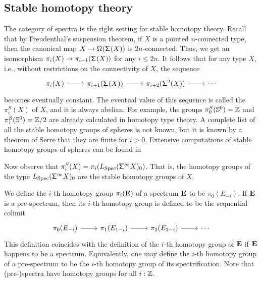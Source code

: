 \documentclass[reqno]{amsart}
\begin{document}
\subsection{Stable homotopy theory}
The category of spectra is the right setting for stable homotopy theory. Recall
that by Freudenthal's suspension theorem, if $X$ is a pointed $n$-connected
type, then the canonical map $X\to\mathsf{\Omega}^{}(\mathsf{\Sigma}^{}(X))$ is $2n$-connected. 
Thus, we get an isomorphism $\pi_i(X)\to\pi_{i+1}(\mathsf{\Sigma}^{}(X))$ for any $i\leq 2n$. 
It follows that for any type $X$, i.e., without restrictions on the connectivity of $X$, the sequence
\begin{equation*}
\begin{tikzcd}
\pi_i(X) \arrow[r] & \pi_{i+1}(\susp(X)) \arrow[r] & \pi_{i+2}(\susp[2](X)) \arrow[r] & \cdots
\end{tikzcd}
\end{equation*}
becomes eventually constant. The eventual value of this sequence is called the  $\pi^S_i(X)$ of $X$, and it is always abelian. For example, the groups $\pi_0^S(\mathbb{S}^{0})=\mathbb{Z}$ and $\pi_1^S(\mathbb{S}^{0})=\mathbb{Z}/2$ are already calculated in homotopy type theory. A complete list of all the stable homotopy groups of spheres is not known, but it is known by a theorem of Serre \cite{Serre53} that they are finite for $i>0$. Extensive computations of stable homotopy groups of spheres can be found in \cite{Kochman96,Ravenel86}

Now observe that $\pi_i^S(X)=\pi_i(L_{\mathrm{Spec}}(\mathsf{\Sigma}^{\infty}{X})_0)$. That is, the homotopy groups of the type $L_{\mathrm{Spec}}(\mathsf{\Sigma}^{\infty}{X})_0$ are the stable homotopy groups of $X$. 

We define the $i$-th homotopy group $\pi_i(\mathbf{E})$ of a spectrum $\mathbf{E}$ to be $\pi_0(E_{-i})$. 
If $\mathbf{E}$ is a pre-spectrum, then its $i$-th homotopy group is defined to be the sequential colimit
\begin{equation*}
\begin{tikzcd}
\pi_0(E_{-i}) \arrow[r] & \pi_{1}(E_{1-i}) \arrow[r] & \pi_{2}(E_{2-i}) \arrow[r] & \cdots
\end{tikzcd}
\end{equation*}
This definition coincides with the definition of the $i$-th homotopy group of $\mathbf{E}$ if $\mathbf{E}$ happens to be a spectrum. Equivalently, one may define the $i$-th homotopy group of a pre-spectrum to be the $i$-th homotopy group of its spectrification. Note that (pre-)spectra have homotopy groups for all $i:\mathbb{Z}$.
\end{document}
